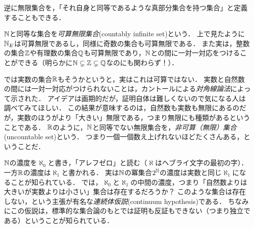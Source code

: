 \documentclass[11pt,a4paper]{jsarticle} %
\begin{document}
逆に無限集合を，「それ自身と同等であるような真部分集合を持つ集合」と定義することもできる．

$\mathbb{N}$と同等な集合を\emph{可算無限集合}(countably infinite set)という．
上で見たように$\mathbb{N}_E$は可算無限であるし，同様に奇数の集合も可算無限である．
また実は，整数の集合$\mathbb{Z}$や有理数の集合$\mathbb{Q}$も可算無限であり，$\mathbb{N}$との間に一対一対応をつけることができる（明らかに$\mathbb{N} \subsetneq \mathbb{Z} \subsetneq \mathbb{Q}$なのにも関わらず！）．

では実数の集合$\mathbb{R}$もそうかというと，実はこれは可算ではない．
実数と自然数の間には一対一対応がつけられないことは，カントールによる\emph{対角線論法}によって示された．
アイデアは画期的だが，証明自体は難しくないので気になる人は調べてみてほしい．
この結果が意味するのは，自然数も実数も無限にあるのだが，実数のほうがより「大きい」無限である，つまり無限にも種類があるということである．
$\mathbb{R}$のように，$\mathbb{N}$と同等でない無限集合を，\emph{非可算（無限）集合}(uncountable set)という．
つまり一個一個数え上げれないほどたくさんある，ということだ．

\begin{develop}
 $\mathbb{N}$の濃度を$\aleph_0$と書き，「アレフゼロ」と読む（$\aleph$はヘブライ文字の最初の字）．
一方$\mathbb{R}$の濃度は$\aleph_1$と書かれる．
実は$\mathbb{N}$の冪集合$2^{\mathbb{N}}$の濃度は実数と同じ$\aleph_1$になることが知られている．
では，$\aleph_0$と$\aleph_1$の中間の濃度，つまり「自然数よりは大きいが実数よりは小さい」集合は存在するだろうか？
このような集合は存在しない，という主張が有名な\emph{連続体仮説}(continuum hypothesis)である．
ちなみにこの仮説は，標準的な集合論のもとでは証明も反証もできない（つまり独立である）ということが知られている．
\end{develop}
\end{document}
